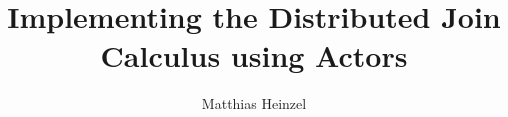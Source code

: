 \title{Implementing the Distributed Join Calculus using Actors}
\author{Matthias Heinzel}
\maketitle

